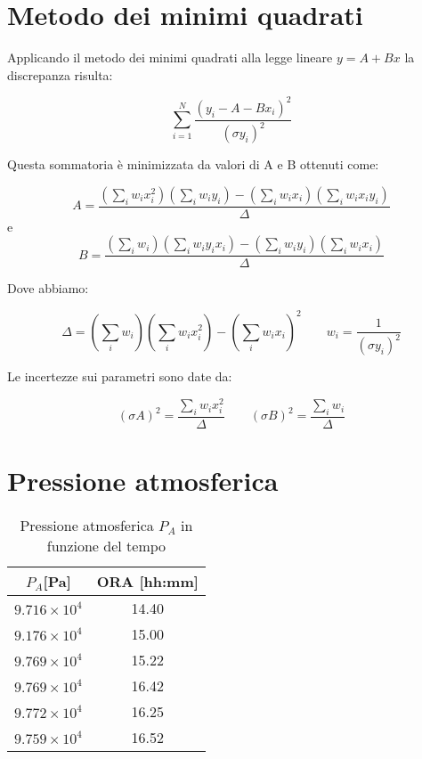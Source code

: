 \begin{appendices}

\section{Metodo dei minimi quadrati}
Applicando il metodo dei minimi quadrati alla legge lineare $y = A + Bx$ la discrepanza risulta:

\begin{equation}
\displaystyle\sum_{i=1}^{N}\frac{(y_i -A-Bx_i)^2}{(\sigma y_i)^2}
\end{equation}
\hspace{-1.8em}

Questa sommatoria è minimizzata da valori di A e B ottenuti come:

\begin{equation}
\label{eq:a}
A = \frac{(\sum_i w_i x_i^2)(\sum_i w_i y_i)-(\sum_i w_i x_i)(\sum_i w_i x_i y_i)}{\Delta} 
\end{equation}
e
\begin{equation}
\label{eq:b}
B = \frac{(\sum_i w_i)(\sum_i w_i y_i x_i)-(\sum_i w_i y_i)(\sum_i w_i x_i)}{\Delta}
\end{equation}

Dove abbiamo:

\[ \Delta = (\sum_i w_i)(\sum_i w_i x_i^2)-(\sum_i w_i x_i)^2  \quad \quad  w_i = \frac{1}{(\sigma y_i)^2}\]
\hspace{-1.8em}

Le incertezze sui parametri sono date da:

\begin{equation} 
\label{eq:sasb}
(\sigma A)^2 = \frac{\sum_i w_i x_i^2}{\Delta}\quad \quad (\sigma B)^2 = \frac{\sum_i w_i}{\Delta}
\end{equation}

\section{Pressione atmosferica}

\begin{table}[H]
	\centering
	\begin{tabular}{|c|c|} \hline
		\textbf{$P_A${[Pa]} } & \textbf{ORA {[hh:mm]} }  \\ \hline
		$9.716\times 10^4$ & 14.40  \\ \hline
		$9.176\times 10^4$ & 15.00  \\ \hline
		$9.769\times 10^4$ & 15.22  \\ \hline
		$9.769\times 10^4$ & 16.42  \\ \hline
		$9.772\times 10^4$ & 16.25  \\ \hline
		$9.759\times 10^4$ & 16.52  \\ \hline
	\end{tabular}
	\caption{Pressione atmosferica $P_A$ in funzione del tempo}
\end{table}





\end{appendices}
